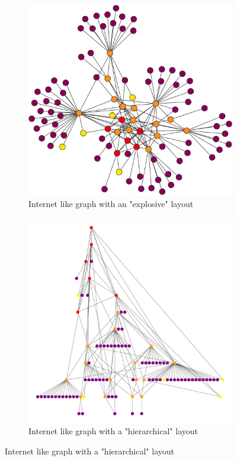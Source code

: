 \documentclass[10pt,conference,letterpaper]{IEEEtran}
\newcommand{\figwidth}{0.78}
\begin{document}
\begin{figure}[tb]
	\centering
	\begin{subfigure}{\columnwidth}
		\centering
		\includegraphics[width=\figwidth\columnwidth]{images/internet_like/graph-100-colored}
		\caption{Internet like graph with an "explosive" layout}
		\label{fig:internet_like_graph_explosive}
		\qquad
	\end{subfigure}

	\begin{subfigure}{\columnwidth}
		\centering
		\includegraphics[width=\figwidth\columnwidth]{images/internet_like/graph_dot}
		\caption{Internet like graph with a "hierarchical" layout}
		\label{fig:internet_like_graph_hierarchical}
		\qquad
	\end{subfigure}


\end{figure}
\end{document}
